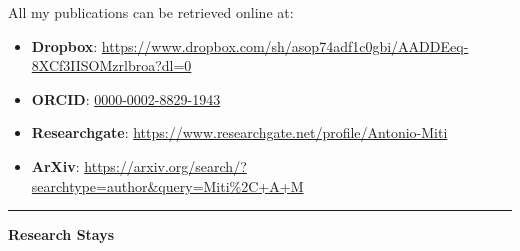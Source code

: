 \documentclass[a4paper]{article}
\newcommand{\block}[1]{\hrule \vspace{0.2cm} \textbf{\Large #1} \vspace{0.2cm}}
\begin{document}
	All my publications can be retrieved online at:
	\begin{itemize}[leftmargin=*, itemsep=0pt, parsep=0pt, topsep=0pt, partopsep=0pt]
		\item[$\cdot$] \textbf{Dropbox}: \url{https://www.dropbox.com/sh/asop74adf1c0gbi/AADDEeq-8XCf3IISOMzrlbroa?dl=0}
		\item[$\cdot$] \textbf{ORCID}: \href{https://orcid.org/0000-0002-8829-1943}{0000-0002-8829-1943}
		\item[$\cdot$] \textbf{Researchgate}: \href{https://www.researchgate.net/profile/Antonio-Miti}{https://www.researchgate.net/profile/Antonio-Miti}
		\item[$\cdot$] \textbf{ArXiv}: \url{https://arxiv.org/search/?searchtype=author\&query=Miti\%2C+A+M}
	\end{itemize}
	\vspace{1em}




	\block{Research Stays}
\end{document}
